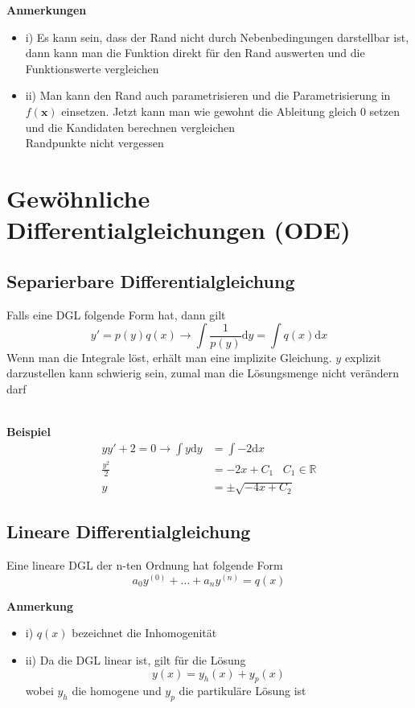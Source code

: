 \documentclass[8pt, a4paper, landscape, fleqn]{scrartcl}
\newenvironment {example}
				{\begin{itshape} \begin{small}}
				{\end{small} \end{itshape}}
\newenvironment {annotation}[1]
				{\begin{itshape} \begin{small} \textbf{#1} \begin{itemize}}
				{\end{itemize} \end{small} \end{itshape}}
\begin{document}
\begin{multicols*}{3}
\begin{example}
\begin{enumerate}
						\end{enumerate}
					\end{example}
					\begin{annotation}{Anmerkungen}
						\item[i)] Es kann sein, dass der Rand nicht durch Nebenbedingungen darstellbar ist, dann kann man die Funktion direkt für den Rand auswerten und die Funktionswerte vergleichen
						\item[ii)] Man kann den Rand auch parametrisieren und die Parametrisierung in $f(\textbf{x})$ einsetzen. Jetzt kann man wie gewohnt die Ableitung gleich 0 setzen und die Kandidaten berechnen vergleichen\\
						Randpunkte nicht vergessen
					\end{annotation}
		\section{Gewöhnliche Differentialgleichungen (ODE)}
			\subsection{Separierbare Differentialgleichung}
				Falls eine DGL folgende Form hat, dann gilt
				\begin{equation*}
					y'=p(y)q(x) \rightarrow \int \frac{1}{p(y)} \text{d}y=\int q(x) \text{d}x
				\end{equation*}
				Wenn man die Integrale löst, erhält man eine implizite Gleichung. $y$ explizit darzustellen kann schwierig sein, zumal man die Lösungsmenge nicht verändern darf\\\\
				\begin{example}
					\textbf{Beispiel}
					\begin{align*}
						yy' + 2=0 \rightarrow \int y \text{d}y&=\int -2 \text{d}x\\		
						\frac{y^2}{2}&=-2x + C_1 \hspace{10pt} C_1 \in \mathbb{R}\\
						y&=\pm \sqrt{-4x + C_2}				 
					\end{align*}
				\end{example}
			\subsection{Lineare Differentialgleichung}
				Eine lineare DGL der n-ten Ordnung hat folgende Form
				\begin{equation*}
					a_0y^{(0)}+\dots+ a_ny^{(n)}=q(x)
				\end{equation*}
				\begin{annotation}{Anmerkung}
					\item [i)]  $q(x)$ bezeichnet die Inhomogenität
					\item [ii)] Da die DGL linear ist, gilt für die Lösung
					\begin{equation*}
						y(x)=y_h(x)+y_p(x)
					\end{equation*}
					wobei $y_h$ die homogene und $y_p$ die partikuläre Lösung ist
				\end{annotation}

\end{multicols*}
\end{document}
